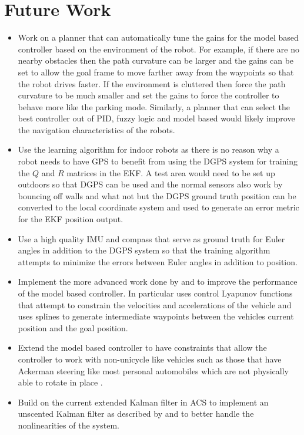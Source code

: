 \chapter{Future Work}
\label{ch:futurework}

\begin{itemize}
\item Work on a planner that can automatically tune the gains for the model based controller based on the environment of the robot. For example, if there are no nearby obstacles then the path curvature can be larger and the gains can be set to allow the goal frame to move farther away from the waypoints so that the robot drives faster. If the environment is cluttered then force the path curvature to be much smaller and set the gains to force the controller to behave more like the parking mode. Similarly, a planner that can select the best controller out of PID, fuzzy logic and model based would likely improve the navigation characteristics of the robots.
\item Use the learning algorithm for indoor robots as there is no reason why a robot needs to have GPS to benefit from using the DGPS system for training the $Q$ and $R$ matrices in the EKF. A test area would need to be set up outdoors so that DGPS can be used and the normal sensors also work by bouncing off walls and what not but the DGPS ground truth position can be converted to the local coordinate system and used to generate an error metric for the EKF position output.
\item Use a high quality IMU and compass that serve as ground truth for Euler angles in addition to the DGPS system so that the training algorithm attempts to minimize the errors between Euler angles in addition to position.
\item Implement the more advanced work done by \cite{Lapierre06} and \cite{Gulati08} to improve the performance of the model based controller. In particular \cite{Gulati08} uses control Lyapunov functions that attempt to constrain the velocities and accelerations of the vehicle and uses splines to generate intermediate waypoints between the vehicles current position and the goal position.
\item Extend the model based controller to have constraints that allow the controller to work with non-unicycle like vehicles such as those that have Ackerman steering like most personal automobiles which are not physically able to rotate in place \cite{Shiller91dynamicmotion}.
\item Build on the current extended Kalman filter in ACS to implement an unscented Kalman filter as described by \cite{ThrunProbRobots06} and \cite{Orderud05} to better handle the nonlinearities of the system.
\end{itemize}
